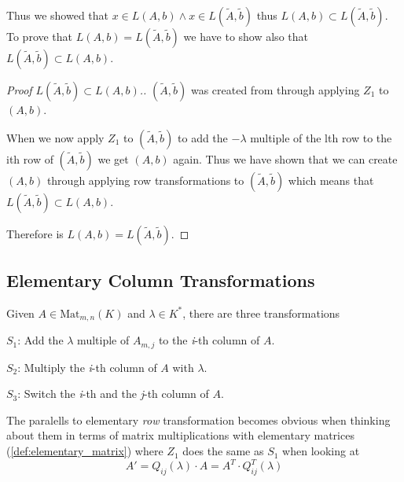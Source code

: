 Thus we showed that \(x \in L(A, b) \land x \in L(\tilde{A}, \tilde{b})\) thus \(L(A, b) \subset L(\tilde{A}, \tilde{b})\).
To prove that \(L(A, b) = L(\tilde{A}, \tilde{b})\) we have to show also that \(L(\tilde{A}, \tilde{b}) \subset L(A, b)\).
\begin{proof}[Proof \(L(\tilde{A}, \tilde{b}) \subset L(A, b)\).]
\((\tilde{A}, \tilde{b})\) was created from through applying \(Z_1\) to \((A, b)\).

When we now apply \(Z_1\) to \((\tilde{A}, \tilde{b})\) to add the \(-\lambda\) multiple of the lth row to the ith row of \((\tilde{A}, \tilde{b})\) we get \((A, b)\) again.
Thus we have shown that we can create \((A, b)\) through applying row transformations to \((\tilde{A}, \tilde{b})\) which means that \(L(\tilde{A}, \tilde{b}) \subset L(A, b)\).

Therefore is \(L(A, b) = L(\tilde{A}, \tilde{b})\).
\end{proof}

\subsection{Elementary Column Transformations}
\begin{definition}\label{def:el_col_transf}
   Given \(A \in \text{Mat}_{m, n}(K)\) and \(\lambda \in K^*\), there are three transformations

   \(S_1\): Add the \(\lambda\) multiple of \(A_{m,j}\) to the \textit{i}-th column of \(A\).

   \(S_2\): Multiply the \textit{i}-th column of \(A\) with \(\lambda\).

   \(S_3\): Switch the \textit{i}-th and the \textit{j}-th column of \(A\).
\end{definition}
\begin{remark}
   The paralells to elementary \textit{row} transformation becomes obvious when thinking about them in terms of matrix multiplications with elementary matrices (\ref{def:elementary_matrix}) where \(Z_1\) does the same as \(S_1\) when looking at
   \[A' = Q_{ij}(\lambda) \cdot A = A^T \cdot Q_{ij}^T(\lambda)\]
\end{remark}

